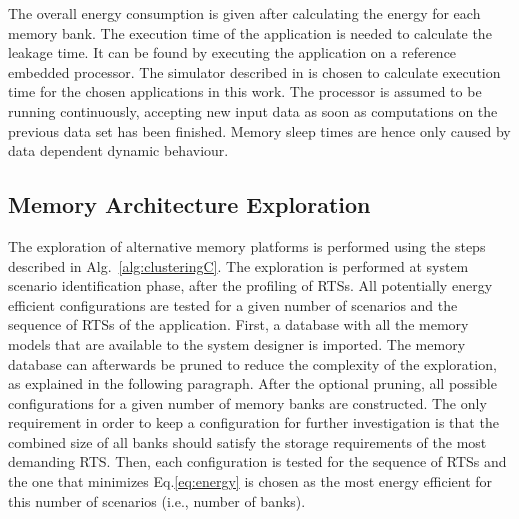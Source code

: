 \setlength{\arraycolsep}{5pt}
The overall energy consumption is given after calculating the energy for each memory bank. 
The execution time of the application is needed to calculate the leakage time. 
It can be found by executing the application on a reference embedded processor. 
The simulator described in \cite{Gem5} is chosen to calculate execution time for the chosen applications in this work. 
The processor is assumed to be running continuously, accepting new input data as soon as computations on the previous data set has been finished. 
Memory sleep times are hence only caused by data dependent dynamic behaviour.

\subsection{Memory Architecture Exploration}

The exploration of alternative memory platforms is performed using the steps described in Alg.~\ref{alg:clusteringC}. 
The exploration is performed at system scenario identification phase, after the profiling of RTSs.
All potentially energy efficient configurations are tested for a given number of scenarios and the sequence of RTSs of the application.
First, a database with all the memory models that are available to the system designer is imported.
The memory database can afterwards be pruned to reduce the complexity of the exploration, as explained in the following paragraph. 
After the optional pruning, all possible configurations for a given number of memory banks are constructed. 
The only requirement in order to keep a configuration for further investigation is that the combined size of all banks should satisfy the storage requirements of the most demanding RTS. 
Then, each configuration is tested for the sequence of RTSs and the one that minimizes Eq.\ref{eq:energy} is chosen as the most energy efficient for this number of scenarios (i.e., number of banks). 

